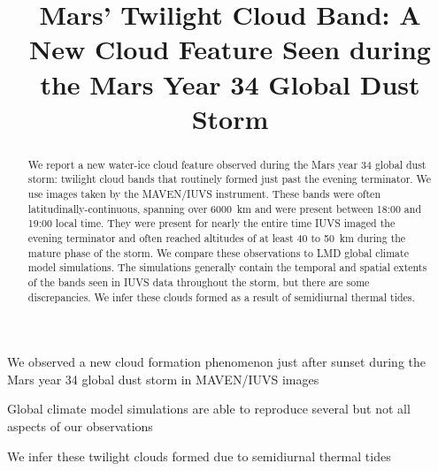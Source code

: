 \documentclass[draft]{agujournal2019}
\begin{document}
\title{Mars' Twilight Cloud Band: A New Cloud Feature Seen during the Mars Year 34 Global Dust Storm}




\begin{keypoints}
  \item We observed a new cloud formation phenomenon just after sunset during the Mars year 34 global dust storm in MAVEN/IUVS images
  \item Global climate model simulations are able to reproduce several but not all aspects of our observations
  \item We infer these twilight clouds formed due to semidiurnal thermal tides 
\end{keypoints}

\begin{abstract}
We report a new water-ice cloud feature observed during the Mars year 34 global dust storm: twilight cloud bands that routinely formed just past the evening terminator. We use images taken by the MAVEN/IUVS instrument. These bands were often latitudinally-continuous, spanning over 6000~km and were present between 18:00 and 19:00 local time. They were present for nearly the entire time IUVS imaged the evening terminator and often reached altitudes of at least 40 to 50~km during the mature phase of the storm. We compare these observations to LMD global climate model simulations. The simulations generally contain the temporal and spatial extents of the bands seen in IUVS data throughout the storm, but there are some discrepancies. We infer these clouds formed as a result of semidiurnal thermal tides.
\end{abstract}
\end{document}
